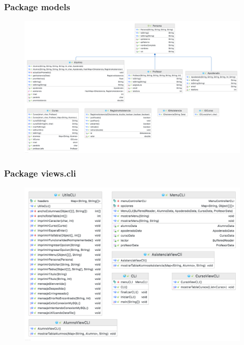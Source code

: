 \clearpage

\subsubsection*{Package models}

\begin{figure}[h]
    \centering
    \includegraphics[width=1\textwidth]{contents/img/paq/models}
\end{figure}

\clearpage

\subsubsection*{Package views.cli}

\begin{figure}[h]
    \centering
    \includegraphics[width=1\textwidth]{contents/img/paq/views.cli}
\end{figure}

